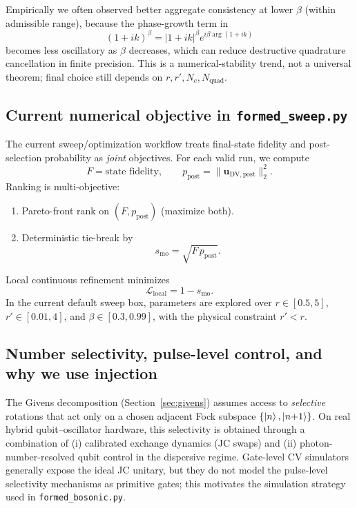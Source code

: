 \documentclass[11pt]{article}
\begin{document}
Empirically we often observed better aggregate consistency at lower $\beta$ (within admissible range), because the phase-growth term in
\begin{equation}
(1+ik)^\beta=|1+ik|^\beta e^{i\beta\arg(1+ik)}
\end{equation}
becomes less oscillatory as $\beta$ decreases, which can reduce destructive quadrature cancellation in finite precision.
This is a numerical-stability trend, not a universal theorem; final choice still depends on $r,r',N_c,N_{\mathrm{quad}}$.

\subsection{Current numerical objective in \texttt{formed\_sweep.py}}
The current sweep/optimization workflow treats final-state fidelity and
post-selection probability as \emph{joint} objectives.
For each valid run, we compute
\begin{equation}
F=\text{state fidelity},\qquad
p_{\mathrm{post}}=\|\bm{u}_{\mathrm{DV,post}}\|_2^2.
\end{equation}
Ranking is multi-objective:
\begin{enumerate}
\item Pareto-front rank on $(F,p_{\mathrm{post}})$ (maximize both).
\item Deterministic tie-break by
\begin{equation}
s_{\mathrm{mo}}=\sqrt{F\,p_{\mathrm{post}}}.
\end{equation}
\end{enumerate}
Local continuous refinement minimizes
\begin{equation}
\mathcal{L}_{\mathrm{local}}=1-s_{\mathrm{mo}}.
\end{equation}
In the current default sweep box, parameters are explored over
$r\in[0.5,5]$, $r'\in[0.01,4]$, and $\beta\in[0.3,0.99]$, with the
physical constraint $r'<r$.

\subsection{Number selectivity, pulse-level control, and why we use injection}
\label{sec:jc-selectivity}
The Givens decomposition (Section~\ref{sec:givens}) assumes access to
\emph{selective} rotations that act only on a chosen adjacent Fock subspace
$\{\ket{n},\ket{n{+}1}\}$.
On real hybrid qubit--oscillator hardware, this selectivity is obtained through
a combination of (i) calibrated exchange dynamics (JC swaps) and
(ii) photon-number-resolved qubit control in the dispersive regime.
Gate-level CV simulators generally expose the ideal JC unitary, but they do not
model the pulse-level selectivity mechanisms as primitive gates; this motivates
the simulation strategy used in \texttt{formed\_bosonic.py}.
\end{document}
